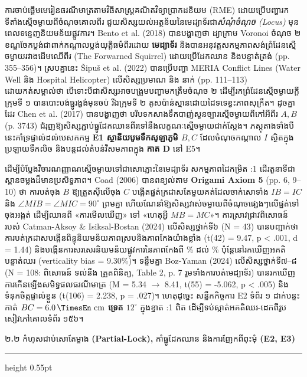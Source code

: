 \documentclass[a4paper,12pt]{article}
\newcommand{\en}[1]{{\TimesEn #1}}
\newcommand{\enbf}[1]{{\TimesEn\textbf{#1}}}
\newcommand{\unit}[1]{\,\text{\en{#1}}}
\newcommand{\ang}[1]{\ensuremath{\angle #1}}
\newcommand{\subsectitle}[1]{{\muol\fontsize{11pt}{14.5pt}\selectfont #1}}
\newcommand{\subsec}[1]{%
  \Needspace{1.6cm}%
  \vspace{4pt}%
  \subsectitle{#1}\par%
  \vspace{-2pt}%
  {\color{black}\hrule height 0.55pt}%
  \vspace{3.5pt}%
}
\begin{document}
ការចាប់ផ្ដើមមេរៀនធរណីមាត្រតាមវិធីសាស្ត្រគណិតវិទ្យាប្រាកដនិយម (\en{RME}) ដោយប្រើបញ្ហារកទីតាំងស្មើចម្ងាយពីចំណុចគោលពីរ ជួយសិស្សយល់អត្ថន័យនៃមេដ្យាទ័រជា\emph{សំណុំចំណុច (Locus)} មុនពេលទន្ទេញនិយមន័យផ្លូវការ។ \en{Bento et al. (2018)} បានបង្ហាញថា ដ្យាក្រាម \en{Voronoi} ចំណុច ២ ខណ្ឌចែកប្លង់ជាពាក់កណ្ដាលប្លង់យុត្តិធម៌ពីរដោយ \textbf{មេដ្យាទ័រ} និងបានអនុវត្តសកម្មភាពសង់ព្រំដែនស្មើចម្ងាយរវាងដើមឈើពីរ (\en{The Forwarned Squirrel}) ដោយប្រើដែកឈាន និងបន្ទាត់ត្រង់ (\en{pp. 355--356})។ ស្របគ្នានេះ \en{Šipuš et al. (2022)} បានប្រើបញ្ហា \en{MERIA Conflict Lines} (\en{Water Well} និង \en{Hospital Helicopter}) លើសិស្សប្រមាណ \en{500} និង \en{200} នាក់ (\en{pp. 111--113}) ដោយកត់សម្គាល់ថា បើទោះបីជាសិស្សអាចបង្រួមបញ្ហាមកត្រឹមចំណុច ២ ដើម្បីរកព្រំដែនស្មើចម្ងាយក្ដី ក្រុមទី ១ បានបោះបង់ធ្នូរង្វង់មុនចប់ រីឯក្រុមទី ២ គូសប៉ាន់ស្មានដោយដៃទទេខ្វះភាពសុក្រឹត។ ដូចគ្នាដែរ \en{Chen et al. (2017)} បានបង្ហាញថា បរិបទកសាងទឹកបាញ់សួនច្បារស្មើចម្ងាយពីកៅអីពីរ $A, B$ (\en{p. 3743}) ជំរុញឱ្យសិស្សភ្ជាប់ធ្នូដែកឈានពីរទៅនឹងលក្ខណៈស្មើចម្ងាយជាក់ស្ដែង។ ភស្តុតាងទាំងបីនេះគាំទ្រផ្ទាល់ដល់បេសកកម្ម \textbf{\en{E1} ស្ថានីយបូមទឹកសូឡាភូមិ $B, C$} ដែលចំណុចកណ្ដាល $I$ ស្ថិតក្នុងប្រឡាយទឹកលិច និងបន្តដល់តំបន់វិសមភាពក្នុង \textbf{កាត \en{D}} នៅ \en{E5}។

ដើម្បីបំប្លែងវិចារណញ្ញាណស្មើចម្ងាយទៅជាសោភ្លោះនៃមេដ្យាទ័រ សកម្មភាពដៃកម្រិត \en{1:1} ដើរតួនាទីជាស្ពានចម្លងដ៏មានប្រសិទ្ធភាព។ \en{Coad (2006)} បានពន្យល់តាម \textbf{\en{Origami Axiom 5}} (\en{pp. 6, 9--10}) ថា ការបត់ចុង $B$ ឱ្យត្រួតស៊ីលើចុង $C$ បង្កើតផ្នត់ក្រដាសតែមួយគត់ដែលចាក់សោទាំង $IB = IC$ និង $\ang{MIB} = \ang{MIC} = 90^\circ$ ព្រមគ្នា ហើយណែនាំឱ្យសិស្សវាស់ចម្ងាយពីចំណុចផ្សេងៗលើផ្នត់ទៅចុងអង្កត់ ដើម្បីឈានពី «ការមើលឃើញ» ទៅ «ហេតុអ្វី $MB = MC$»។ ការស្រាវជ្រាវពិសោធន៍របស់ \en{Catman-Aksoy \& Isiksal-Bostan (2024)} លើសិស្សថ្នាក់ទី៦ (\en{N = 43}) បានបញ្ជាក់ថា ការបត់ក្រដាសបង្កើនពិន្ទុនិយមន័យភាពស្របនិងភាពកែងយ៉ាងខ្លាំង (\en{t(42) = 9.47, p < .001, d = 1.44}) និងបង្កើនការសរសេរនិយមន័យផ្លូវការនៃភាពកែងពី \en{37.20\%} ដល់ \en{51.16\%} ប៉ុន្តែនៅរកឃើញអគតិបន្ទាត់ឈរ (\en{verticality bias = 9.30\%})។ ទន្ទឹមគ្នា \en{Boz-Yaman (2024)} លើសិស្សថ្នាក់ទី៧--៨ (\en{N = 108}: \en{56} ពិសោធន៍ ទល់នឹង \en{52} ត្រួតពិនិត្យ, \en{Table 2, p. 7} រួមទាំងការបត់មេដ្យាទ័រ) បានរកឃើញការកើនឡើងសមិទ្ធផលធរណីមាត្រ (\en{M = 5.34 $\to$ 8.41, t(55) = -5.062, p < .005}) និងទំនុកចិត្តផ្ទាល់ខ្លួន (\en{t(106) = 2.238, p = .027})។ ហេតុដូច្នេះ សន្លឹកកិច្ចការ \en{E2} ទំព័រ ១ ដាក់បន្ទះកាត់ $BC = 6.0\unit{cm}$ \textbf{ទ្រេត $12^\circ$} ក្នុងខ្នាត \en{1:1} ពិត ដើម្បីទប់ស្កាត់អគតិឈរ-ដេកពីរូបសៀវភៅគោលទំព័រ ១៥៦។

\subsec{២\enbf{.}២ កំហុសជាប់សោតែម្ខាង \enbf{(Partial-Lock),} កាំធ្នូដែកឈាន និងការញែកពីពុះមុំ \enbf{(E2, E3)}}
\end{document}
